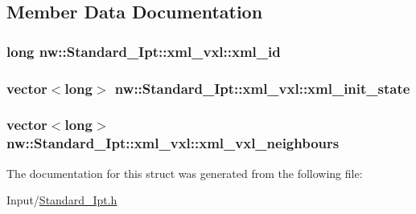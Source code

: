 \subsection{Member Data Documentation}
\hypertarget{structnw_1_1_standard___ipt_1_1xml__vxl_aa3049a5f0e119aded3f128c9451553e1}{
\subsubsection[{xml\+\_\+id}]{\setlength{\rightskip}{0pt plus 5cm}long nw\+::\+Standard\+\_\+\+Ipt\+::xml\+\_\+vxl\+::xml\+\_\+id}}\label{structnw_1_1_standard___ipt_1_1xml__vxl_aa3049a5f0e119aded3f128c9451553e1}
\hypertarget{structnw_1_1_standard___ipt_1_1xml__vxl_ab4f6ff40cccb2d961d94b356d6ad4eda}{
\subsubsection[{xml\+\_\+init\+\_\+state}]{\setlength{\rightskip}{0pt plus 5cm}vector$<$long$>$ nw\+::\+Standard\+\_\+\+Ipt\+::xml\+\_\+vxl\+::xml\+\_\+init\+\_\+state}}\label{structnw_1_1_standard___ipt_1_1xml__vxl_ab4f6ff40cccb2d961d94b356d6ad4eda}
\hypertarget{structnw_1_1_standard___ipt_1_1xml__vxl_abc2d0940cccd69b37fab4029ba180150}{
\subsubsection[{xml\+\_\+vxl\+\_\+neighbours}]{\setlength{\rightskip}{0pt plus 5cm}vector$<$long$>$ nw\+::\+Standard\+\_\+\+Ipt\+::xml\+\_\+vxl\+::xml\+\_\+vxl\+\_\+neighbours}}\label{structnw_1_1_standard___ipt_1_1xml__vxl_abc2d0940cccd69b37fab4029ba180150}


The documentation for this struct was generated from the following file\+:\begin{DoxyCompactItemize}
\item 
Input/\hyperlink{_standard___ipt_8h}{Standard\+\_\+\+Ipt.\+h}\end{DoxyCompactItemize}
